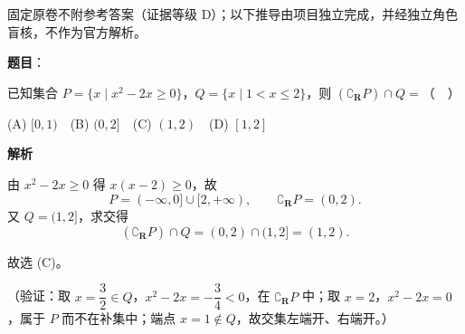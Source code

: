 
\begin{gktip}
固定原卷不附参考答案（证据等级 D）；以下推导由项目独立完成，并经独立角色盲核，不作为官方解析。
\end{gktip}

\begin{answer}

\textbf{题目}：

已知集合 \(P=\{x\mid x^2-2x\geqslant0\}\)，\(Q=\{x\mid 1<x\leqslant2\}\)，则 \((\complement_{\mathbf{R}}P)\cap Q=\)（　）

(A) \([0,1)\)　(B) \((0,2]\)　(C) \((1,2)\)　(D) \([1,2]\)

\textbf{解析}

由 \(x^2-2x\geqslant0\) 得 \(x(x-2)\geqslant0\)，故
\nopagebreak[4]
\[
P=(-\infty,0]\cup[2,+\infty),\qquad \complement_{\mathbf{R}}P=(0,2).
\]
又 \(Q=(1,2]\)，求交得
\nopagebreak[4]
\[
(\complement_{\mathbf{R}}P)\cap Q=(0,2)\cap(1,2]=(1,2).
\]

故选 (C)。

（验证：取 \(x=\dfrac32\in Q\)，\(x^2-2x=-\dfrac34<0\)，在 \(\complement_{\mathbf{R}}P\) 中；取 \(x=2\)，\(x^2-2x=0\)，属于 \(P\) 而不在补集中；端点 \(x=1\notin Q\)，故交集左端开、右端开。）


\end{answer}
